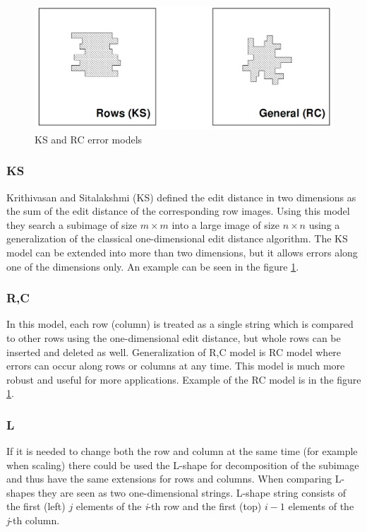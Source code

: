 \begin{figure}
\centering
\includegraphics[scale=0.3]{RC_KS.png}
\caption{KS and RC error models \cite{mdApproxPM}}
\label{ks_rc}
\end{figure}


\subsubsection{KS}\label{ks}
Krithivasan and Sitalakshmi (KS) defined the edit distance in two dimensions as the sum of the edit distance of the corresponding row images. Using this model they search a subimage of size $m \times m$ into a large image of size $n \times n$ using a generalization of the classical one-dimensional edit distance algorithm.
The KS model can be extended into more than two dimensions, but it allows errors along one of the dimensions only. \cite{mdApproxPM}
An example can be seen in the figure \ref{ks_rc}.
\subsubsection{R,C}
In this model, each row (column) is treated as a single string which is compared to other rows using the one-dimensional edit distance, but 
whole rows can be inserted and deleted as well.
Generalization of R,C model is RC model where errors can occur along rows or columns at any time. This model is much more robust and useful for more applications. Example of the RC model is in the figure \ref{ks_rc}. \cite{mdApproxPM}
\subsubsection{L}
If it is needed to change both the row and column at the same time (for example when scaling) there could be used the L-shape for decomposition of the subimage and thus have the same extensions for rows and columns. When comparing L-shapes they are seen as two one-dimensional strings. L-shape string consists of the first (left) $j$ elements of the \textit{i}-th row and the first (top) $i-1$ elements of the \textit{j}-th column.

